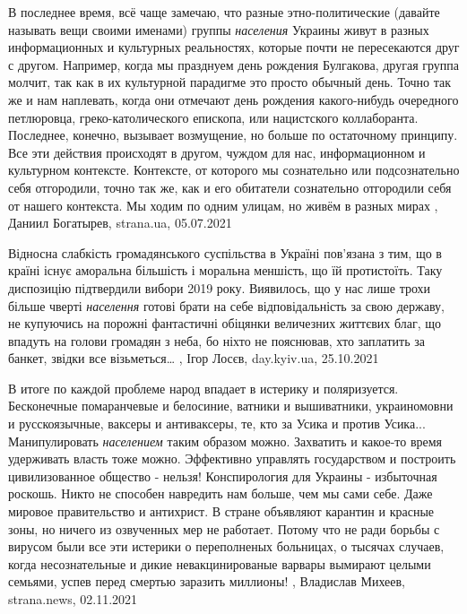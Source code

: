 В последнее время, всё чаще замечаю, что разные этно-политические (давайте
называть вещи своими именами) группы \emph{населения} Украины живут в разных
информационных и культурных реальностях, которые почти не пересекаются друг с
другом. Например, когда мы празднуем день рождения Булгакова, другая группа
молчит, так как в их культурной парадигме это просто обычный день. Точно так же
и нам наплевать, когда они отмечают день рождения какого-нибудь очередного
петлюровца, греко-католического епископа, или нацистского коллаборанта.
Последнее, конечно, вызывает возмущение, но больше по остаточному принципу. Все
эти действия происходят в другом, чуждом для нас, информационном и культурном
контексте. Контексте, от которого мы сознательно или подсознательно себя
отгородили, точно так же, как и его обитатели сознательно отгородили себя от
нашего контекста. Мы ходим по одним улицам, но живём в разных мирах
, 
Даниил Богатырев, strana.ua, 05.07.2021

Відносна слабкість громадянського суспільства в Україні пов’язана з тим, що в
країні існує аморальна більшість і моральна меншість, що їй протистоїть. Таку
диспозицію підтвердили вибори 2019 року. Виявилось, що у нас лише трохи більше
чверті \emph{населення} готові брати на себе відповідальність за свою державу, не
купуючись на порожні фантастичні обіцянки величезних життєвих благ, що впадуть
на голови громадян з неба, бо ніхто не пояснював, хто заплатить за банкет,
звідки все візьметься…
, 
Ігор Лосєв, day.kyiv.ua, 25.10.2021

В итоге по каждой проблеме народ впадает в истерику и поляризуется. Бесконечные
помаранчевые и белосиние, ватники и вышиватники, украиномовни и русскоязычные,
ваксеры и антиваксеры, те, кто за Усика и против Усика...  Манипулировать
\emph{населением} таким образом можно. Захватить и какое-то время удерживать
власть тоже можно. Эффективно управлять государством и построить цивилизованное
общество - нельзя!  Конспирология для Украины - избыточная роскошь. Никто не
способен навредить нам больше, чем мы сами себе.  Даже мировое правительство и
антихрист.  В стране объявляют карантин и красные зоны, но ничего из озвученных
мер не работает. Потому что не ради борьбы с вирусом были все эти истерики о
переполненых больницах, о тысячах случаев, когда несознательные и дикие
невакцинированые варвары вымирают целыми семьями, успев перед смертью заразить
миллионы!
, 
Владислав Михеев, strana.news, 02.11.2021
